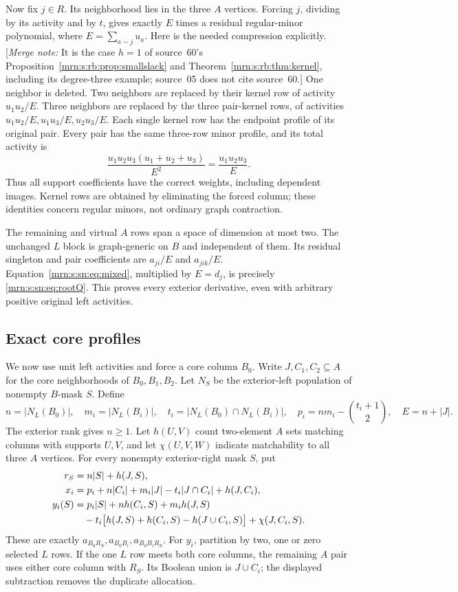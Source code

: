\documentclass[11pt,a4paper]{article}
\theoremstyle{remark}\newtheorem{remark}[theorem]{Remark}
\newcommand{\mnote}[1]{[\textit{Merge note:} #1]}
\begin{document}
Now fix $j\in R$. Its neighborhood lies in the three $A$ vertices. Forcing
$j$, dividing by its activity and by $t$, gives exactly $E$ times a residual
regular-minor polynomial, where $E=\sum_{a\sim j}u_a$.
Here is the needed compression explicitly. \mnote{It is the case $h=1$ of source~60's Proposition~\ref{mrn:s:rb:prop:smallslack} and Theorem~\ref{mrn:s:rb:thm:kernel}, including its degree-three example; source~05 does not cite source~60.} One neighbor is deleted. Two
neighbors are replaced by their kernel row of activity $u_1u_2/E$.
Three neighbors are replaced by the three pair-kernel rows, of activities
$u_1u_2/E,u_1u_3/E,u_2u_3/E$. Each single kernel row has the endpoint profile
of its original pair. Every pair has the same three-row minor profile, and
its total activity is
\[
 \frac{u_1u_2u_3(u_1+u_2+u_3)}{E^2}=\frac{u_1u_2u_3}{E}.
\]
Thus all support coefficients have the correct weights, including dependent
images. Kernel rows are obtained by eliminating the forced column; these
identities concern regular minors, not ordinary graph contraction.

The remaining and virtual $A$ rows span a space of dimension at most two.
The unchanged $L$ block is graph-generic on $B$ and independent of them.
Its residual singleton and pair coefficients are $a_{ji}/E$ and $a_{jik}/E$.
Equation~\eqref{mrn:s:sn:eq:mixed}, multiplied by $E=d_j$, is precisely
\eqref{mrn:s:sn:eq:rootQ}. This proves every exterior derivative, even with arbitrary
positive original left activities.

\subsection{Exact core profiles}
We now use unit left activities and force a core column $B_0$. Write
$J,C_1,C_2\subseteq A$ for the core neighborhoods of $B_0,B_1,B_2$.
Let $N_S$ be the exterior-left population of nonempty $B$-mask $S$.
Define
\[
 n=|N_L(B_0)|,\quad m_i=|N_L(B_i)|,\quad
 t_i=|N_L(B_0)\cap N_L(B_i)|,\quad
 p_i=nm_i-\binom{t_i+1}{2},\quad E=n+|J|.
\]
The exterior rank gives $n\ge1$.
Let $h(U,V)$ count two-element $A$ sets matching columns with supports $U,V$,
and let $\chi(U,V,W)$ indicate matchability to all three $A$ vertices.
For every nonempty exterior-right mask $S$, put
\begin{align}
 r_S&=n|S|+h(J,S),\notag\\
 x_i&=p_i+n|C_i|+m_i|J|-t_i|J\cap C_i|+h(J,C_i),\label{mrn:s:sn:eq:profiles}\\
 y_i(S)&=p_i|S|+nh(C_i,S)+m_ih(J,S)\notag\\
 &\quad-t_i\bigl[h(J,S)+h(C_i,S)-h(J\cup C_i,S)\bigr]
             +\chi(J,C_i,S).\notag
\end{align}
These are exactly $a_{B_0R_S},a_{B_0B_i},a_{B_0B_iR_S}$.
For $y_i$, partition by two, one or zero selected $L$ rows.
If the one $L$ row meets both core columns, the remaining $A$ pair uses
either core column with $R_S$. Its Boolean union is $J\cup C_i$; the displayed
subtraction removes the duplicate allocation.
\end{document}
